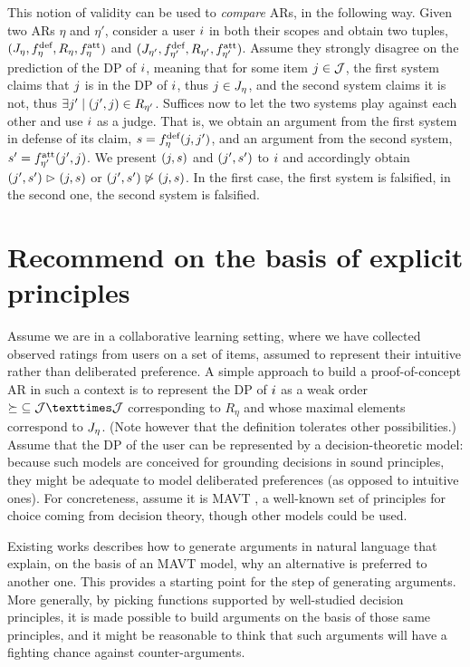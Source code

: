 \documentclass[french, english]{da2pl2018}
\begin{document}
This notion of validity can be used to \emph{compare} \acp{AR}, in the following way. Given two \acp{AR} $\eta$ and $\eta'$, consider a user $\usr$ in both their scopes and obtain two tuples, $(\mitems, \mdef, R_\eta, \matt)$ and $(\mitems[\eta'], \mdef[\eta'], R_{\eta'}, \matt[\eta'])$. Assume they strongly disagree on the prediction of the \ac{DP} of $\usr$, meaning that for some item $\itm \in \allitems$, the first system claims that $\itm$ is in the \ac{DP} of $\usr$, thus $\itm \in \mitems$, and the second system claims it is not, thus $\exists \itm' \suchthat (\itm', \itm) \in R_{\eta'}$. Suffices now to let the two systems play against each other and use $\usr$ as a judge. That is, we obtain an argument from the first system in defense of its claim, $\ar = \mdef(\itm, \itm')$, and an argument from the second system, $\ar' = \matt[\eta'](\itm', \itm)$. We present $(\itm, \ar)$ and $(\itm', \ar')$ to $\usr$ and accordingly obtain $(\itm', \ar') \ibeats (\itm, \ar)$ or $(\itm', \ar') \nibeats (\itm, \ar)$. In the first case, the first system is falsified, in the second one, the second system is falsified.

\section{Recommend on the basis of explicit principles}
\label{sec:princ}
Assume we are in a collaborative learning setting, where we have collected observed ratings from users on a set of items, assumed to represent their intuitive rather than deliberated preference. 
A simple approach to build a proof-of-concept \ac{AR} in such a context is to represent the \ac{DP} of $\usr$ as a weak order ${\succeq} \subseteq \allitems × \allitems$ corresponding to $R_\eta$ and whose maximal elements correspond to $\mitems$. (Note however that the definition tolerates other possibilities.)
Assume that the \ac{DP} of the user can be represented by a decision-theoretic model: because such models are conceived for grounding decisions in sound principles, they might be adequate to model deliberated preferences (as opposed to intuitive ones). For concreteness, assume it is \ac{MAVT} \citep{keeney_decisions_1993}, a well-known set of principles for choice coming from decision theory, though other models could be used.

Existing works \citep{carenini_generating_2006, labreuche_general_2011} describes how to generate arguments in natural language that explain, on the basis of an \ac{MAVT} model, why an alternative is preferred to another one. This provides a starting point for the step of generating arguments.
More generally, by picking functions supported by well-studied decision principles, it is made possible to build arguments on the basis of those same principles, and it might be reasonable to think that such arguments will have a fighting chance against counter-arguments.
\end{document}
